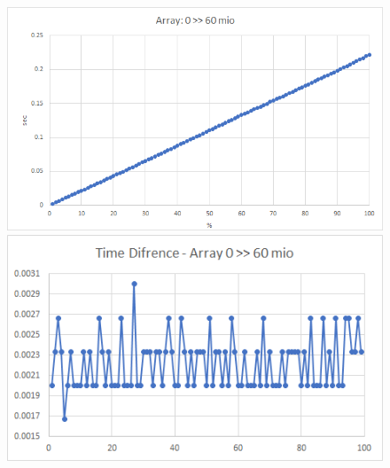 \documentclass{TUBAFarbeiten}
\begin{document}
\begin{figure}[H]
\label{fig:Array0-60}
\includegraphics[scale=0.9]{Array0-60}
\begin{center}
\includegraphics[scale=1]{Array0-60-Time}
\end{center}
\end{figure}
\end{document}
